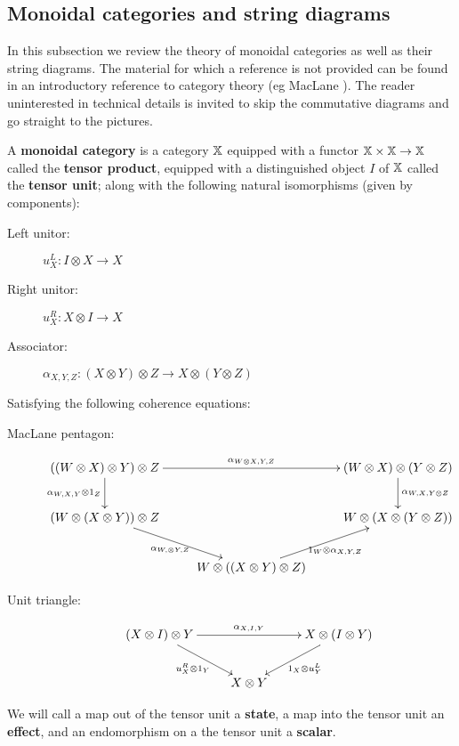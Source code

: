 
\subsection{Monoidal categories and string diagrams}
\label{subsec:moncat}

In this subsection we review the theory of monoidal categories as well as their string diagrams.   The material for which a reference is not provided can be found in an introductory reference to category theory (eg MacLane \cite{maclane}).  The reader uninterested in technical details is invited to skip the commutative diagrams and go straight to the pictures.

\begin{definition}
A {\bf monoidal category} is a category $\mathbb{X}$ equipped with a functor $\mathbb{X}\times\mathbb{X}\to \mathbb{X}$ called the {\bf tensor product}, equipped with a distinguished object $I$ of $\mathbb{X}$ called the {\bf tensor unit}; along with the following natural isomorphisms (given by components):

\begin{description}
\item[Left unitor:]
\hfil$
u_X^L:I\otimes X \to X
$
\item[Right unitor:]
\hfil$
u_X^R: X\otimes I \to X
$
\item[Associator:]
\hfil$
\alpha_{X,Y,Z}:(X\otimes Y)\otimes Z \to X\otimes(Y\otimes Z)
$
\end{description}

Satisfying the following coherence equations:

\begin{description}
\item[MacLane pentagon:]
$$
\xymatrix{
  ((W\otimes X )\otimes Y)\otimes Z \ar[rr]^{\alpha_{W\otimes X,Y,Z}} \ar[d]_{\alpha_{W,X,Y}\otimes 1_Z}
    &
    & (W\otimes X )\otimes (Y\otimes Z) \ar[d]^{\alpha_{W, X,Y\otimes Z}}
  \\  (W\otimes(X\otimes Y))\otimes Z \ar[dr]_{\alpha_{W,\otimes Y,Z}}
    & 
    & W\otimes (X\otimes(Y\otimes Z)) 
  \\&
    W\otimes ((X\otimes Y)\otimes Z) \ar[ur]_{1_W\otimes \alpha_{X,Y,Z}}
}
$$
\item[Unit triangle:]
$$
\xymatrix{
  (X\otimes I)\otimes Y \ar[rr]^{\alpha_{X,I,Y}} \ar[dr]_{u_X^{R}\otimes 1_Y}
    &
    & X\otimes (I\otimes Y) \ar[dl]^{1_X\otimes u_Y^{L}}\\
  & X\otimes Y
}
$$
\end{description}
We will call a map out of the tensor unit a {\bf state}, a map into the tensor unit an {\bf effect}, and an endomorphism on a the tensor unit a {\bf scalar}.
\end{definition}
